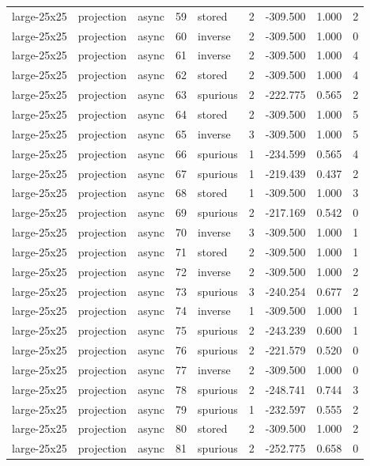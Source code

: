 \begin{tabular}{lllrlrrrr}
large-25x25 & projection & async & 59 & stored & 2 & -309.500 & 1.000 & 2 \\
large-25x25 & projection & async & 60 & inverse & 2 & -309.500 & 1.000 & 0 \\
large-25x25 & projection & async & 61 & inverse & 2 & -309.500 & 1.000 & 4 \\
large-25x25 & projection & async & 62 & stored & 2 & -309.500 & 1.000 & 4 \\
large-25x25 & projection & async & 63 & spurious & 2 & -222.775 & 0.565 & 2 \\
large-25x25 & projection & async & 64 & stored & 2 & -309.500 & 1.000 & 5 \\
large-25x25 & projection & async & 65 & inverse & 3 & -309.500 & 1.000 & 5 \\
large-25x25 & projection & async & 66 & spurious & 1 & -234.599 & 0.565 & 4 \\
large-25x25 & projection & async & 67 & spurious & 1 & -219.439 & 0.437 & 2 \\
large-25x25 & projection & async & 68 & stored & 1 & -309.500 & 1.000 & 3 \\
large-25x25 & projection & async & 69 & spurious & 2 & -217.169 & 0.542 & 0 \\
large-25x25 & projection & async & 70 & inverse & 3 & -309.500 & 1.000 & 1 \\
large-25x25 & projection & async & 71 & stored & 2 & -309.500 & 1.000 & 1 \\
large-25x25 & projection & async & 72 & inverse & 2 & -309.500 & 1.000 & 2 \\
large-25x25 & projection & async & 73 & spurious & 3 & -240.254 & 0.677 & 2 \\
large-25x25 & projection & async & 74 & inverse & 1 & -309.500 & 1.000 & 1 \\
large-25x25 & projection & async & 75 & spurious & 2 & -243.239 & 0.600 & 1 \\
large-25x25 & projection & async & 76 & spurious & 2 & -221.579 & 0.520 & 0 \\
large-25x25 & projection & async & 77 & inverse & 2 & -309.500 & 1.000 & 0 \\
large-25x25 & projection & async & 78 & spurious & 2 & -248.741 & 0.744 & 3 \\
large-25x25 & projection & async & 79 & spurious & 1 & -232.597 & 0.555 & 2 \\
large-25x25 & projection & async & 80 & stored & 2 & -309.500 & 1.000 & 2 \\
large-25x25 & projection & async & 81 & spurious & 2 & -252.775 & 0.658 & 0 \\

\end{tabular}
